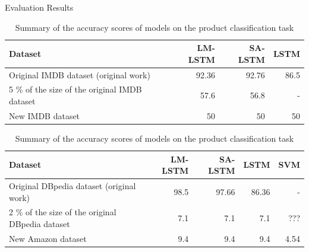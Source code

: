 \documentclass[aspectratio=169,xcolor=dvipsnames]{beamer}
\begin{document}
\begin{frame}{Evaluation Results}
    \tableofcontents

\begin{table}[h!]
    \begin{center}
    
    \caption{Summary of the accuracy scores of models on the IMDB sentiment classification task}
    \label{tab:table1}
    \begin{tabular}{l|r|r|r|} %
      \hline
      \textbf{Dataset} & \textbf{LM-LSTM} & \textbf{SA-LSTM} & \textbf{LSTM} \\
      \hline
      Original IMDB dataset (original work) & 92.36 & 92.76 & 86.5 \\
      5 \% of the size of the original IMDB dataset & 57.6 & 56.8 & - \\
      New IMDB dataset & 50 & 50 & 50 \\
      \hline
    \end{tabular}
    
    \caption{Summary of the accuracy scores of models on the product classification task}
    \label{tab:table2}
    \begin{tabular}{l|r|r|r|r|} 
      \hline
      \textbf{Dataset} & \textbf{LM-LSTM} & \textbf{SA-LSTM} & \textbf{LSTM} & \textbf{SVM}\\
      \hline
      Original DBpedia dataset (original work) & 98.5 & 97.66 & 86.36 & -\\
      2 \% of the size of the original DBpedia dataset & 7.1 & 7.1 & 7.1 & ??? \\
      New Amazon dataset & 9.4 & 9.4 & 9.4 & 4.54\\
      \hline
    \end{tabular}
  
  \end{center}
\end{table}

\end{frame}
\end{document}
